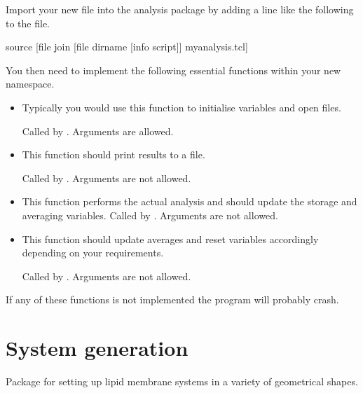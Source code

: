   Import your new file into the analysis package by adding a line like
  the following to the  file.

\begin{code}
    source [file join [file dirname [info script]] myanalysis.tcl]
\end{code}

You then need to implement the following essential functions within
your new namespace.
\begin{itemize}
\item {}

  Typically you would use this function to initialise variables and
  open files.

  Called by . Arguments
  are allowed.
\item {}

  This function should print results to a file.

  Called by . Arguments
  are not allowed.
\item {}

  This function performs the actual analysis and should update the
  storage and averaging variables.  Called by
  . Arguments are not
  allowed.
\item {}

  This function should update averages and reset variables accordingly
  depending on your requirements.

  Called by . Arguments
  are not allowed.
\end{itemize}
If any of these functions is not implemented the program will probably
crash.


\section{System generation}\label{mbtools::systemg}

Package for setting up lipid membrane systems in a variety of
geometrical shapes.

